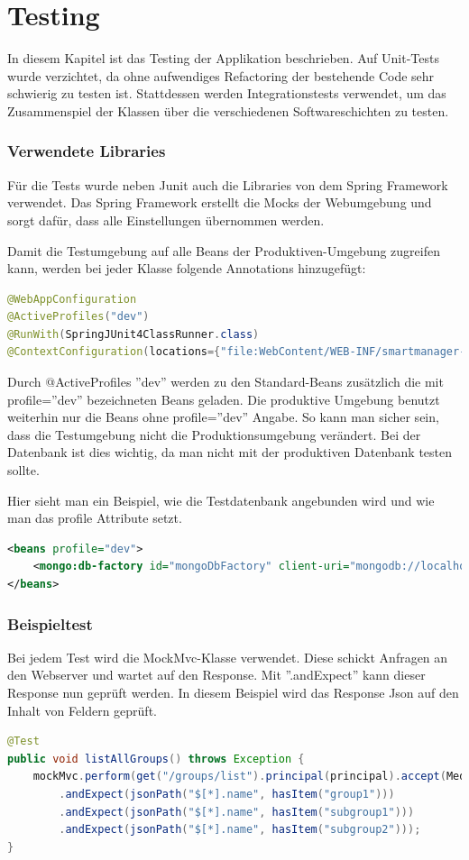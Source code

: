 \section{Testing}
In diesem Kapitel ist das Testing der Applikation beschrieben. Auf Unit-Tests wurde verzichtet, da ohne aufwendiges Refactoring der bestehende Code sehr schwierig zu testen ist. Stattdessen werden Integrationstests verwendet, um das Zusammenspiel der Klassen über die verschiedenen Softwareschichten zu testen.

\subsubsection{Verwendete Libraries}
Für die Tests wurde neben Junit auch die Libraries von dem Spring Framework verwendet. Das Spring Framework erstellt die Mocks der Webumgebung und sorgt dafür, dass alle Einstellungen übernommen werden.

Damit die Testumgebung auf alle Beans der Produktiven-Umgebung zugreifen kann, werden bei jeder Klasse folgende Annotations hinzugefügt:
\begin{lstlisting}[language=java]
@WebAppConfiguration
@ActiveProfiles("dev")
@RunWith(SpringJUnit4ClassRunner.class)
@ContextConfiguration(locations={"file:WebContent/WEB-INF/smartmanager-servlet.xml"})
\end{lstlisting}

Durch @ActiveProfiles ''dev'' werden zu den Standard-Beans zusätzlich die mit profile=''dev'' bezeichneten Beans geladen. Die produktive Umgebung benutzt weiterhin nur die Beans ohne profile=''dev'' Angabe. So kann man sicher sein, dass die Testumgebung nicht die Produktionsumgebung verändert. Bei der Datenbank ist dies wichtig, da man nicht mit der produktiven Datenbank testen sollte.

Hier sieht man ein Beispiel, wie die Testdatenbank angebunden wird und wie man das profile Attribute setzt.
\begin{lstlisting}[language=xml]
<beans profile="dev">
	<mongo:db-factory id="mongoDbFactory" client-uri="mongodb://localhost/test" />
</beans>
\end{lstlisting}

\subsubsection{Beispieltest}
Bei jedem Test wird die MockMvc-Klasse verwendet. Diese schickt Anfragen an den Webserver und wartet auf den Response. Mit ''.andExpect'' kann dieser Response nun geprüft werden. In diesem Beispiel wird das Response Json auf den Inhalt von Feldern geprüft.
\begin{lstlisting}[language=java]
@Test
public void listAllGroups() throws Exception {
	mockMvc.perform(get("/groups/list").principal(principal).accept(MediaType.APPLICATION_JSON))
		.andExpect(jsonPath("$[*].name", hasItem("group1")))
		.andExpect(jsonPath("$[*].name", hasItem("subgroup1")))
		.andExpect(jsonPath("$[*].name", hasItem("subgroup2")));
}
\end{lstlisting}

